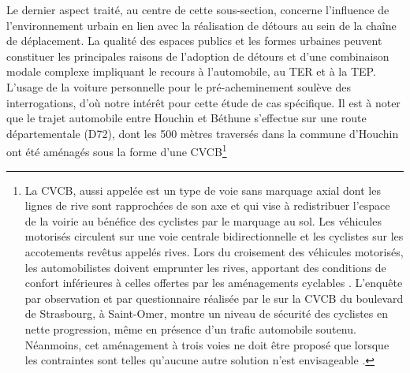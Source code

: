 \begin{refsegment}
Le dernier aspect traité, au centre de cette sous-section, concerne l'influence de l'environnement urbain en lien avec la réalisation de détours au sein de la chaîne de déplacement. La qualité des espaces publics et les formes urbaines peuvent constituer les principales raisons de l'adoption de détours et d'une combinaison modale complexe impliquant le recours à l'automobile, au \acrshort{TER} et à la \acrshort{TEP}. L'usage de la voiture personnelle pour le pré-acheminement soulève des interrogations, d'où notre intérêt pour cette étude de cas spécifique. Il est à noter que le trajet automobile entre Houchin et Béthune s'effectue sur une route départementale (D72), dont les 500 mètres traversés dans la commune d'Houchin ont été aménagés sous la forme d'une \acrfull{CVCB}\footnote{
    La \acrshort{CVCB}, aussi appelée  est un type de voie sans marquage axial dont les lignes de rive sont rapprochées de son axe et qui vise à redistribuer l'espace de la voirie au bénéfice des cyclistes par le marquage au sol. Les véhicules motorisés circulent sur une voie centrale bidirectionnelle et les cyclistes sur les accotements revêtus appelés rives. Lors du croisement des véhicules motorisés, les automobilistes doivent emprunter les rives, apportant des conditions de confort inférieures à celles offertes par les aménagements cyclables \textcolor{blue}{\autocite[24]{jouannot_mieux_2018}}. L'enquête par observation et par questionnaire réalisée par le \textcolor{blue}{\textcite[21]{cerema_nord_picardie_chaussee_2018}} sur la \acrshort{CVCB} du boulevard de Strasbourg, à Saint-Omer, montre un niveau de sécurité des cyclistes en nette progression, même en présence d'un trafic automobile soutenu. Néanmoins, cet aménagement à trois voies ne doit être proposé que lorsque les contraintes sont telles qu'aucune autre solution n'est envisageable \textcolor{blue}{\autocite[27]{jouannot_mieux_2018}}.
}
\end{refsegment}
